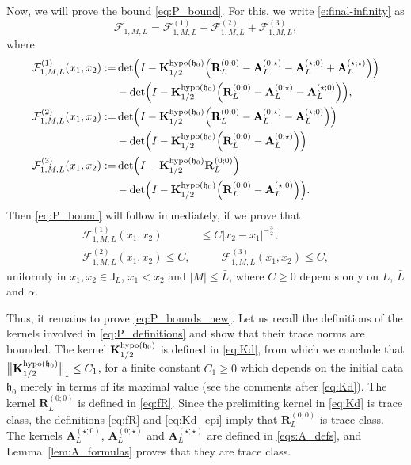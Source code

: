 \documentclass[oneside,final,11pt]{amsart}
\theoremstyle{definition}
\newcommand{\fh}{\mathfrak{h}}
\newcommand{\bJ}{\mathsf{J}}
\newcommand{\dens}{\CF}
\newcommand{\1}[1]{\mathbf{1}_{#1}}
\newcommand{\uptext}[1]{\text{\upshape{#1}}}
\DeclareMathOperator{\hypo}{\uptext{hypo}}
\newcommand{\fx}{x}
\newcommand{\fM}{M}
\newcommand{\fA}{\mathbf{A}}
\newcommand{\fK}{\mathbf{K}}
\newcommand{\fR}{\mathbf{R}}
\newcommand{\CF}{\mathcal{F}}
\numberwithin{equation}{section}
\begin{document}
Now, we will prove the bound \eqref{eq:P_bound}. For this, we write \eqref{e:final-infinity} as
\begin{equation}
\dens_{1, \fM, L} = \dens^{(1)}_{1, \fM, L} + \dens^{(2)}_{1, \fM, L} + \dens^{(3)}_{1, \fM, L},
\end{equation}
where
\begin{subequations}\label{eq:P_definitions}
\begin{align}
\dens^{(1)}_{1, \fM, L}(\fx_1, \fx_2) :=& \det\Bigl(I- \fK^{\hypo(\fh_0)}_{1/2} \Bigl(\fR^{(0; 0)}_L - \fA^{(0; \star)}_L - \fA^{(\star; 0)}_L + \fA^{(\star; \star)}_L\Bigr) \Bigr) \\
&- \det\Bigl(I- \fK^{\hypo(\fh_0)}_{1/2} \Bigl(\fR^{(0; 0)}_L - \fA^{(0; \star)}_L - \fA^{(\star; 0)}_L \Bigr) \Bigr),\label{eq:P1_def}\\
%
\dens^{(2)}_{1, \fM, L}(\fx_1, \fx_2) :=& \det\Bigl(I- \fK^{\hypo(\fh_0)}_{1/2} \Bigl(\fR^{(0; 0)}_L - \fA^{(0; \star)}_L - \fA^{(\star; 0)}_L\Bigr) \Bigr) \\
& - \det\Bigl(I- \fK^{\hypo(\fh_0)}_{1/2} \Bigl(\fR^{(0; 0)}_L - \fA^{(0; \star)}_L \Bigr) \Bigr)\label{eq:P2_def}\\
%
\dens^{(3)}_{1, \fM, L}(\fx_1, \fx_2) :=& \det \Bigl(I-\fK^{\hypo(\fh_0)}_{1/2} \fR^{(0; 0)}_L\Bigr) \\
&- \det \Bigl(I- \fK^{\hypo(\fh_0)}_{1/2} \Bigl(\fR^{(0; 0)}_L - \fA^{(\star; 0)}_L\Bigr) \Bigr). \label{eq:P3_def}
\end{align}
\end{subequations}
Then \eqref{eq:P_bound} will follow immediately, if we prove that
\begin{subequations}\label{eq:P_bounds_new}
\begin{align}
\dens^{(1)}_{1, \fM, L}(\fx_1, \fx_2) &\leq C |\fx_2 - \fx_1|^{-\frac{3}{2}},\label{eq:P1_bound}\\
\dens^{(2)}_{1, \fM, L}(\fx_1, \fx_2) \leq C,& \qquad \dens^{(3)}_{1, \fM, L}(\fx_1, \fx_2) \leq C,\label{eq:P2_bound}
\end{align}
\end{subequations}
uniformly in $\fx_1, \fx_2 \in \bJ_L$, $\fx_1 < \fx_2$ and $|\fM| \leq \bar L$, where $C\geq 0$ depends only on $L$, $\bar L$ and $\alpha$.
\smallskip

Thus, it remains to prove \eqref{eq:P_bounds_new}. Let us recall the definitions of the kernels involved in \eqref{eq:P_definitions} and show that their trace norms are bounded. The kernel $\fK^{\hypo(\fh_0)}_{1/2}$ is defined in \eqref{eq:Kd}, from which we conclude that $\bigl\| \fK^{\hypo(\fh_0)}_{1/2} \bigr\|_1 \leq C_1$, for a finite constant $C_1 \geq 0$ which depends on the initial data $\fh_0$ merely in terms of its maximal value (see the comments after \eqref{eq:Kd}). The kernel $\fR^{(0; 0)}_L$ is defined in \eqref{eq:fR}. Since the prelimiting kernel in \eqref{eq:Kd} is trace class, the definitions \eqref{eq:fR} and \eqref{eq:Kd_epi} imply that $\fR^{(0; 0)}_L$ is trace class. The kernels $\fA^{(\star; 0)}_L$,  $\fA^{(0; \star)}_L$ and $\fA^{(\star; \star)}_L$ are defined in \eqref{eqs:A_defs}, and Lemma~\ref{lem:A_formulas} proves that they are trace class.
\end{document}
